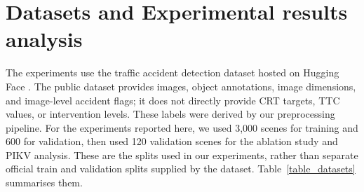 \section{Datasets and Experimental results analysis} \label{section4}
The experiments use the traffic accident detection dataset hosted on Hugging Face \cite{hiennguyen2024accident}. The public dataset provides images, object annotations, image dimensions, and image-level accident flags; it does not directly provide CRT targets, TTC values, or intervention levels. These labels were derived by our preprocessing pipeline. For the experiments reported here, we used 3,000 scenes for training and 600 for validation, then used 120 validation scenes for the ablation study and PIKV analysis. These are the splits used in our experiments, rather than separate official train and validation splits supplied by the dataset. Table~\ref{table_datasets} summarises them.


\begin{table}[H]
\caption{Data used in our experiments.}
\centering
\label{table_datasets}
\end{table}

